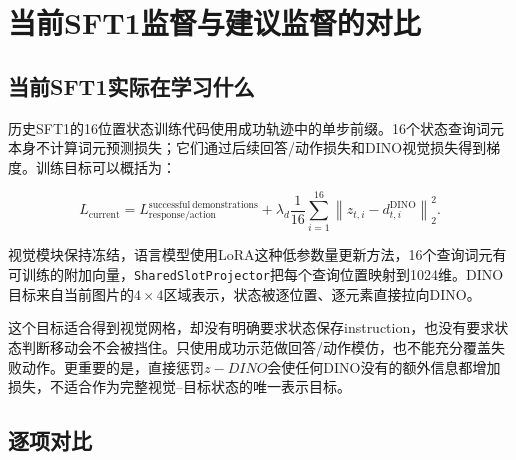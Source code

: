 \documentclass[UTF8,11pt,a4paper,fontset=none]{ctexart}
\newcommand{\code}[1]{\texttt{#1}}
\begin{document}
\section{当前SFT1监督与建议监督的对比}

\subsection{当前SFT1实际在学习什么}

历史SFT1的16位置状态训练代码使用成功轨迹中的单步前缀。16个状态查询词元本身不计算词元预测损失；它们通过后续回答/动作损失和DINO视觉损失得到梯度。训练目标可以概括为：

\begin{equation}
  L_{\mathrm{current}}
  =L_{\mathrm{response/action}}^{\mathrm{successful\ demonstrations}}
  +\lambda_d\frac{1}{16}\sum_{i=1}^{16}
  \left\|z_{t,i}-d_{t,i}^{\mathrm{DINO}}\right\|_2^2.
\end{equation}

视觉模块保持冻结，语言模型使用LoRA这种低参数量更新方法，16个查询词元有可训练的附加向量，\code{SharedSlotProjector}把每个查询位置映射到1024维。DINO目标来自当前图片的$4\times4$区域表示，状态被逐位置、逐元素直接拉向DINO。

这个目标适合得到视觉网格，却没有明确要求状态保存instruction，也没有要求状态判断移动会不会被挡住。只使用成功示范做回答/动作模仿，也不能充分覆盖失败动作。更重要的是，直接惩罚$z-DINO$会使任何DINO没有的额外信息都增加损失，不适合作为完整视觉--目标状态的唯一表示目标。

\subsection{逐项对比}
\end{document}

